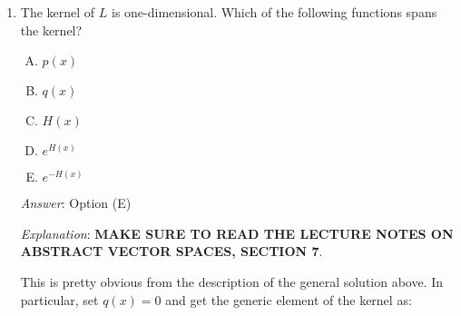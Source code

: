 \documentclass[10pt]{amsart}
\begin{document}
\begin{enumerate}
  {\em Historical note (last time)}: $14$ out of $26$ got this. $8$ chose (D),
  $3$ chose (B), and $1$ chose (E).

  \vspace{0.6in}

  We now recall our earlier discussion of the solution process for
  first-order linear differential equations. Consider a first-order
  linear differential equation with independent variable $x$ and
  dependent variable $y$, with the equation having the form:

  $$y' + p(x)y = q(x)$$

  where $p,q \in C^\infty(\R)$.

  We solve this equation as follows. Let $H$ be an antiderivative of
  $p$, so that $H'(x) = p(x)$. 

  $$\frac{d}{dx}\left(ye^{H(x)}\right) = q(x)e^{H(x)}$$

  This gives:

  $$ye^{H(x)}  = \int q(x)e^{H(x)} \, dx$$
  
  So:

  $$y = e^{-H(x)}\int q(x)e^{H(x)} \, dx$$

  The indefinite integration gives a $+C$, so overall, we get:

  $$y = Ce^{-H(x)} + \text{particular solution}$$

  It's now time to understand this in terms of linear algebra.

  Define a linear transformation $L:C^\infty(\R) \to C^\infty(\R)$ as:

  $$f(x) \mapsto f'(x) + p(x)f(x)$$

\item The kernel of $L$ is one-dimensional. Which of the following
  functions spans the kernel?

  \begin{enumerate}[(A)]
  \item $p(x)$
  \item $q(x)$
  \item $H(x)$
  \item $e^{H(x)}$
  \item $e^{-H(x)}$
  \end{enumerate}

  {\em Answer}: Option (E)

  {\em Explanation}: {\bf MAKE SURE TO READ THE LECTURE NOTES ON
    ABSTRACT VECTOR SPACES, SECTION 7}. 

  This is pretty obvious from the description of the general solution
  above. In particular, set $q(x) = 0$ and get the generic element of
  the kernel as:


\end{enumerate}
\end{document}
